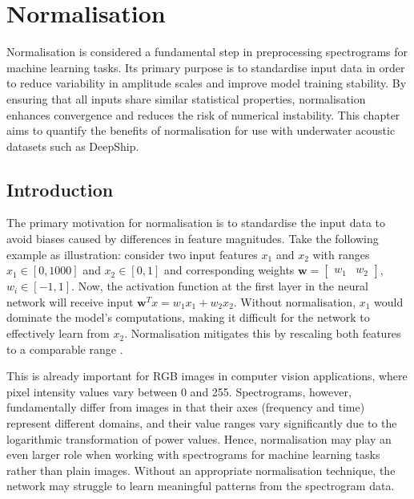 \chapter{Normalisation}



Normalisation is considered a fundamental step in preprocessing spectrograms for machine learning tasks. Its primary purpose is to standardise input data in order to reduce variability in amplitude scales and improve model training stability. By ensuring that all inputs share similar statistical properties, normalisation enhances convergence and reduces the risk of numerical instability. This chapter aims to quantify the benefits of normalisation for use with underwater acoustic datasets such as DeepShip.

\section{Introduction}

The primary motivation for normalisation is to standardise the input data to avoid biases caused by differences in feature magnitudes. Take the following example as illustration: consider two input features $x_1$ and $x_2$ with ranges $x_1 \in [0, 1000]$ and $x_2 \in [0, 1]$ and corresponding weights $\bm{w} = \begin{bmatrix} w_1 & w_2 \end{bmatrix}$, $w_i \in [-1, 1]$. Now, the activation function at the first layer in the neural network will receive input $\bm{w}^T x = w_1x_1 + w_2x_2$. Without normalisation, $x_1$ would dominate the model's computations, making it difficult for the network to effectively learn from $x_2$. Normalisation mitigates this by rescaling both features to a comparable range \cite{gunes_answer_2020}.

This is already important for RGB images in computer vision applications, where pixel intensity values vary between 0 and 255. Spectrograms, however, fundamentally differ from images in that their axes (frequency and time) represent different domains, and their value ranges vary significantly due to the logarithmic transformation of power values. Hence, normalisation may play an even larger role when working with spectrograms for machine learning tasks rather than plain images. Without an appropriate normalisation technique, the network may struggle to learn meaningful patterns from the spectrogram data.


